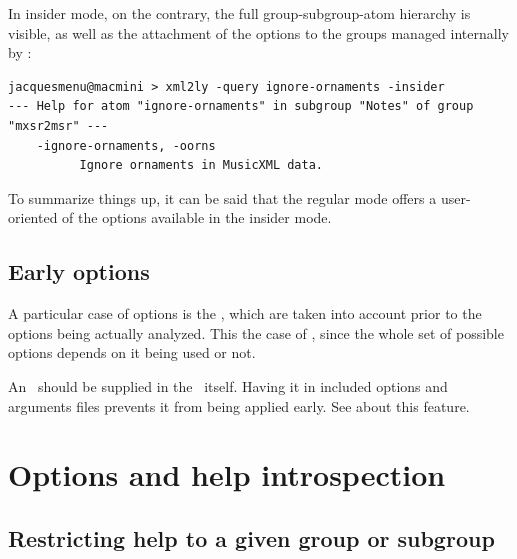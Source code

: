 In insider mode, on the contrary, the full group-subgroup-atom hierarchy is visible, as well as the attachment of the options to the groups managed internally by \mf:
\begin{lstlisting}[language=Terminal]
jacquesmenu@macmini > xml2ly -query ignore-ornaments -insider
--- Help for atom "ignore-ornaments" in subgroup "Notes" of group "mxsr2msr" ---
    -ignore-ornaments, -oorns
          Ignore ornaments in MusicXML data.
\end{lstlisting}

To summarize things up, it can be said that the regular mode offers a user-oriented  of the options available in the insider mode.


\section{Early options}

A particular case of options is the , which are taken into account prior to the options being actually analyzed.
This the case of , since the whole set of possible options depends on it being used or not.

An \earlyOption\ should be supplied in the \CLI\ itself. Having it in included options and arguments files prevents it from being applied early. See  about this feature.


\chapter{Options and help introspection}

\section{Restricting help to a given group or subgroup}

